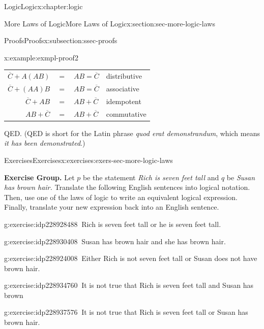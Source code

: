 \documentclass[twoside,10pt,]{book}
\numberwithin{equation}{section}
\begin{document}
\begin{chapterptx}{Logic}{}{Logic}{}{}{x:chapter:logic}
\begin{sectionptx}{More Laws of Logic}{}{More Laws of Logic}{}{}{x:section:sec-more-logic-laws}
\begin{subsectionptx}{Proofs}{}{Proofs}{}{}{x:subsection:ssec-proofs}
\begin{example}{}{x:example:exmpl-proof2}
\begin{center}
{\begin{tabular}{llll}
\multicolumn{1}{r}{\(\overline{C}+A(AB)\)}&\(=\)&\(AB=\overline{C}\)&distributive\tabularnewline[0pt]
\multicolumn{1}{r}{\(\overline{C}+(AA)B\)}&\(=\)&\(AB=\overline{C}\)&associative\tabularnewline[0pt]
\multicolumn{1}{r}{\(\overline{C}+AB\)}&\(=\)&\(AB+\overline{C}\)&idempotent\tabularnewline[0pt]
\multicolumn{1}{r}{\(AB+\overline{C}\)}&\(=\)&\(AB+\overline{C}\)&commutative
\end{tabular}
}%
\end{center}%
 QED.  (QED is short for the Latin phrase \emph{quod erat demonstrandum}, which means \emph{it has been demonstrated}.)\end{example}
\end{subsectionptx}
%
%
\typeout{************************************************}
\typeout{************************************************}
%
\begin{exercises-subsection}{Exercises}{}{Exercises}{}{}{x:exercises:exers-sec-more-logic-laws}
\par\medskip\noindent%
\textbf{Exercise Group.}\space\space%
Let \(p\) be the statement \emph{Rich is seven feet tall} and \(q\) be \emph{Susan has brown hair.}  Translate the following English sentences into logical notation.  Then, use one of the laws of logic to write an equivalent logical expression.  Finally, translate your new expression back into an English sentence.\begin{exercisegroup}
\begin{divisionexerciseeg}{1}{}{}{g:exercise:idp228928488}%
\(\ \)Rich is seven feet tall or he is seven feet tall.\end{divisionexerciseeg}%
\begin{divisionexerciseeg}{2}{}{}{g:exercise:idp228930408}%
\(\ \)Susan has brown hair and she has brown hair.\end{divisionexerciseeg}%
\begin{divisionexerciseeg}{3}{}{}{g:exercise:idp228924008}%
\(\ \)Either Rich is not seven feet tall or Susan does not have brown hair.\end{divisionexerciseeg}%
\begin{divisionexerciseeg}{4}{}{}{g:exercise:idp228934760}%
\(\ \)It is not true that Rich is seven feet tall and Susan has brown\end{divisionexerciseeg}%
\begin{divisionexerciseeg}{5}{}{}{g:exercise:idp228937576}%
\(\ \)It is not true that Rich is seven feet tall or Susan has brown hair.\end{divisionexerciseeg}%

\end{exercisegroup}
\end{exercises-subsection}
\end{sectionptx}
\end{chapterptx}
\end{document}
